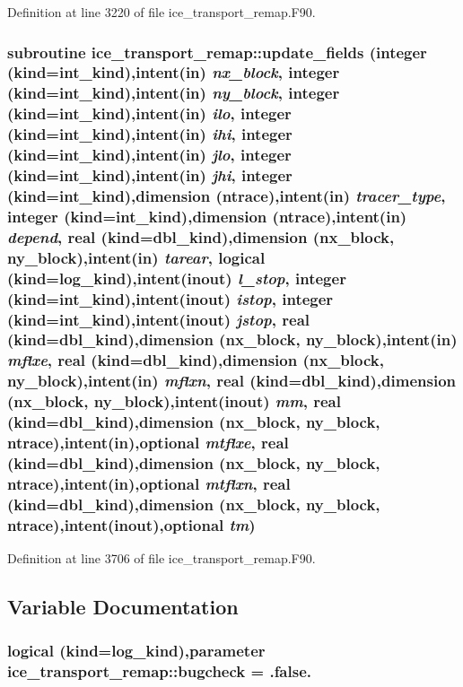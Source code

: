 Definition at line 3220 of file ice\_\-transport\_\-remap.F90.\hypertarget{namespaceice__transport__remap_a2f57bc59a0a273bc0c6aff4104b094c0}{
\subsubsection[{update\_\-fields}]{\setlength{\rightskip}{0pt plus 5cm}subroutine ice\_\-transport\_\-remap::update\_\-fields (integer (kind=int\_\-kind),intent(in) {\em nx\_\-block}, \/  integer (kind=int\_\-kind),intent(in) {\em ny\_\-block}, \/  integer (kind=int\_\-kind),intent(in) {\em ilo}, \/  integer (kind=int\_\-kind),intent(in) {\em ihi}, \/  integer (kind=int\_\-kind),intent(in) {\em jlo}, \/  integer (kind=int\_\-kind),intent(in) {\em jhi}, \/  integer (kind=int\_\-kind),dimension (ntrace),intent(in) {\em tracer\_\-type}, \/  integer (kind=int\_\-kind),dimension (ntrace),intent(in) {\em depend}, \/  real (kind=dbl\_\-kind),dimension (nx\_\-block, ny\_\-block),intent(in) {\em tarear}, \/  logical (kind=log\_\-kind),intent(inout) {\em l\_\-stop}, \/  integer (kind=int\_\-kind),intent(inout) {\em istop}, \/  integer (kind=int\_\-kind),intent(inout) {\em jstop}, \/  real (kind=dbl\_\-kind),dimension (nx\_\-block, ny\_\-block),intent(in) {\em mflxe}, \/  real (kind=dbl\_\-kind),dimension (nx\_\-block, ny\_\-block),intent(in) {\em mflxn}, \/  real (kind=dbl\_\-kind),dimension (nx\_\-block, ny\_\-block),intent(inout) {\em mm}, \/  real (kind=dbl\_\-kind),dimension (nx\_\-block, ny\_\-block, ntrace),intent(in),optional {\em mtflxe}, \/  real (kind=dbl\_\-kind),dimension (nx\_\-block, ny\_\-block, ntrace),intent(in),optional {\em mtflxn}, \/  real (kind=dbl\_\-kind),dimension (nx\_\-block, ny\_\-block, ntrace),intent(inout),optional {\em tm})}}
\label{namespaceice__transport__remap_a2f57bc59a0a273bc0c6aff4104b094c0}


Definition at line 3706 of file ice\_\-transport\_\-remap.F90.

\subsection{Variable Documentation}
\hypertarget{namespaceice__transport__remap_a2ea16fe2f40b061e8beaf561ebf7524c}{
\subsubsection[{bugcheck}]{\setlength{\rightskip}{0pt plus 5cm}logical (kind=log\_\-kind),parameter {\bf ice\_\-transport\_\-remap::bugcheck} = .false.}}
\label{namespaceice__transport__remap_a2ea16fe2f40b061e8beaf561ebf7524c}


